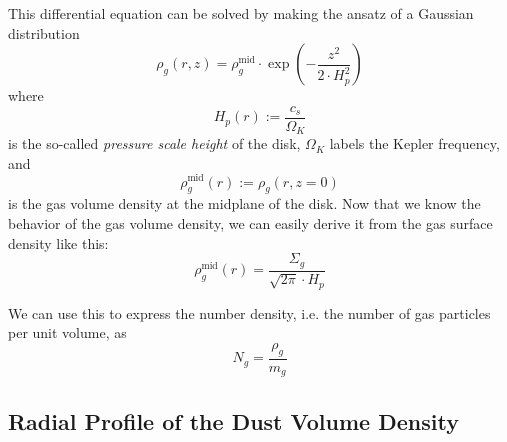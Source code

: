         This differential equation can be solved by making the ansatz of a Gaussian distribution
        \begin{equation}
            \boxed{
                \rho_g(r,z) = \rho_g^\text{mid}\cdot\exp\left(-\frac{z^2}{2\cdot H_p^2}\right)
            }
        \end{equation}
        where
        \begin{equation}
            H_p(r) :=\frac{c_s}{\Omega_K}  %
        \end{equation}
        is the so-called \textit{pressure scale height} of the disk,
        $\Omega_K$ labels the Kepler frequency,
        and
        \begin{equation}
            \rho_g^\text{mid}(r) := \rho_g(r,z=0)
        \end{equation}
        is the gas volume density at the midplane of the disk.
        Now that we know the behavior of the gas volume density, we can easily derive it from 
        the gas surface density like this: %
        \begin{equation}
            \label{eq:gas_volume_density_vs_distance_from_star}
            \boxed{\rho_g^\text{mid}(r) =\frac{\Sigma_g}{\sqrt{2\pi}\cdot H_p}}
        \end{equation}


        We can use this to express the number density, i.e. 
        the number of gas particles per unit volume, as
        \begin{equation}
            N_g
                =\frac{\rho_g}{m_g}
        \end{equation}


    \subsection{Radial Profile of the Dust Volume Density}

